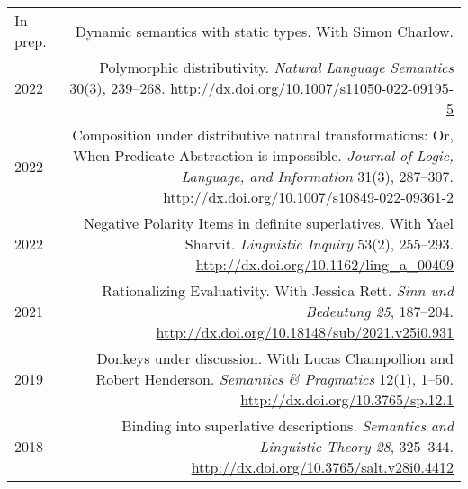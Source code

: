 \documentclass[12pt]{article}
\renewcommand{\arraystretch}{1.25} %
\newcommand{\doi}[1]{\url{http://dx.doi.org/#1}}
\newcommand{\refmark}{\textcolor{gray}{\textdagger}}
\newcommand{\flag}{\llap{\refmark~~}}
\begin{document}
\begingroup
\renewcommand{\arraystretch}{1.5} %
\begin{longtable}{LR}
  In prep.
        & Dynamic semantics with static types.\newline
          With Simon Charlow.\\
  \flag%
  2022  & Polymorphic distributivity.\newline
          \textit{Natural Language Semantics} 30(3), 239--268.\newline
          \doi{10.1007/s11050-022-09195-5}\\
  \flag%
  2022  & Composition under distributive natural transformations: Or, When
          Predicate Abstraction is impossible.\newline
          \textit{Journal of Logic, Language, and Information} 31(3), 287--307.\newline
          \doi{10.1007/s10849-022-09361-2}\\
  \flag%
  2022  & Negative Polarity Items in definite superlatives.\newline
          With Yael Sharvit.\newline
          \textit{Linguistic Inquiry} 53(2), 255--293.\newline
          \doi{10.1162/ling_a_00409}\\
  2021  & Rationalizing Evaluativity.\newline
          With Jessica Rett.\newline
          \textit{Sinn und Bedeutung 25}, 187--204.\newline
          \doi{10.18148/sub/2021.v25i0.931}\\
  \flag%
  2019  & Donkeys under discussion.\newline
          With Lucas Champollion and Robert Henderson.\newline
          \textit{Semantics \& Pragmatics} 12(1), 1--50.\newline
          \doi{10.3765/sp.12.1}\\
  2018  & Binding into superlative descriptions.\newline
          \textit{Semantics and Linguistic Theory 28}, 325--344.\newline
          \doi{10.3765/salt.v28i0.4412}\\

\end{longtable}
\end{document}
